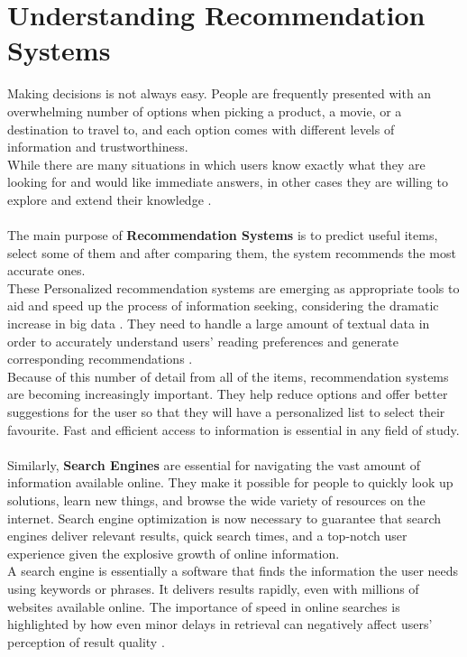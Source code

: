 \documentclass[\myFontSize,a4paper,oneside,english,hidelinks]{article}
\begin{document}
\section{Understanding Recommendation Systems}
Making decisions is not always easy. People are frequently presented with an overwhelming number of options when picking a product, a movie, or a destination to travel to, and each option comes with different levels of information and trustworthiness. \\
While there are many situations in which users know exactly what they are looking for and would like immediate answers, in other cases they are willing to explore and extend their knowledge \cite{Blanco201333}.\\\\
The main purpose of \textbf{Recommendation Systems} is to predict useful items, select some of them and after comparing them, the system recommends the most accurate ones.\\ 
These Personalized recommendation systems are emerging as appropriate tools to aid and speed up the process of information seeking, considering the dramatic increase in big data \cite{Haruna2017}. They need to handle a large amount of textual data in order to accurately understand users’ reading preferences and generate corresponding recommendations \cite{Yan2024}. \\
%
Because of this number of detail from all of the items, recommendation systems are becoming increasingly important. They help reduce options and offer better suggestions for the user so that they will have a personalized list to select their favourite. Fast and efficient access to information is essential in any field of study. \\\\
%
Similarly, \textbf{Search Engines} are essential for navigating the vast amount of information available online. They make it possible for people to quickly look up solutions, learn new things, and browse the wide variety of resources on the internet. Search engine optimization is now necessary to guarantee that search engines deliver relevant results, quick search times, and a top-notch user experience given the explosive growth of online information.\\
A search engine is essentially a software that finds the information the user needs using keywords or phrases. It delivers results rapidly, even with millions of websites available online.
The importance of speed in online searches is highlighted by how even minor delays in retrieval can negatively affect users' perception of result quality \cite{pub.1171882357}.\\
\end{document}
